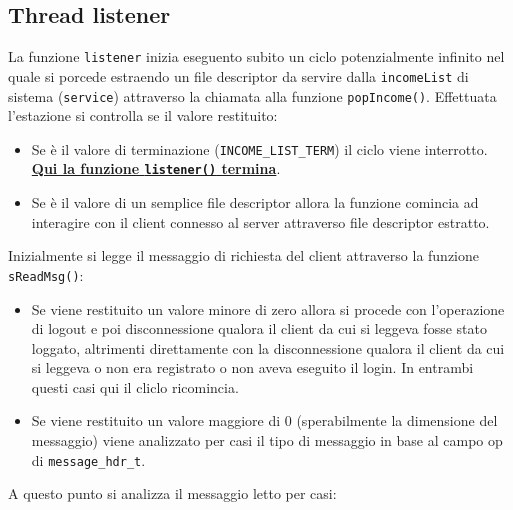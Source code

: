 \documentclass[a4paper,12pt]{report}
\begin{document}
\subsection*{Thread listener}
La funzione \texttt{listener} inizia eseguento subito un ciclo potenzialmente infinito nel quale si porcede estraendo un file descriptor da servire dalla \texttt{incomeList} di sistema (\texttt{service}) attraverso la chiamata alla funzione \texttt{popIncome()}.
Effettuata l'estazione si controlla se il valore restituito:
\begin{itemize}
\item Se è il valore di terminazione (\texttt{INCOME\_LIST\_TERM}) il ciclo viene interrotto.\\
  \textbf{\underline{Qui la funzione \texttt{listener()} termina}}.
\item Se è il valore di un semplice file descriptor allora la funzione comincia ad interagire con il client
  connesso al server attraverso file descriptor estratto.
\end{itemize}
Inizialmente si legge il messaggio di richiesta del client attraverso la funzione \texttt{sReadMsg()}:
\begin{itemize}
\item Se viene restituito un valore minore di zero allora si procede con l'operazione di logout e poi disconnessione qualora il client da cui si leggeva fosse stato loggato, altrimenti direttamente con la disconnessione qualora il client da cui si leggeva o non era registrato o non aveva eseguito il login. In entrambi questi casi qui il cliclo ricomincia.
\item Se viene restituito un valore maggiore di 0 (sperabilmente la dimensione del messaggio) viene analizzato per casi il tipo di messaggio in base al campo op di \texttt{message\_hdr\_t}.
\end{itemize}

A questo punto si analizza il messaggio letto per casi:
\end{document}
